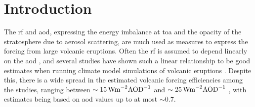 \documentclass{ametsocV6.1}
\begin{document}

\section{Introduction}



The \gls{rf} and \gls{aod}, expressing the energy imbalance at \gls{toa} and the opacity
of the stratosphere due to aerosol scattering, are much used as measures to express the
forcing from large volcanic eruptions. Often the \gls{rf} is assumed to depend linearly
on the \gls{aod} \citep{myhre2013,andersson2015}, and several studies have shown such a
linear relationship to be good estimates when running climate model simulations of
volcanic eruptions \citep{mills2017,hansen2005,gregory2016,marshall2020,pitari2016b}.
Despite this, there is a wide spread in the estimated volcanic forcing efficiencies
among the studies, ranging between \(\sim \SI{15}{\watt\metre^{-2}\ce{AOD}^{-1}}\)
\citep{pitari2016b} and \(\sim \SI{25}{\watt\metre^{-2}\ce{AOD}^{-1}}\)
\citep{myhre2013}, with estimates being based on \gls{aod} values up to at most \(\sim
0.7\).
\end{document}
